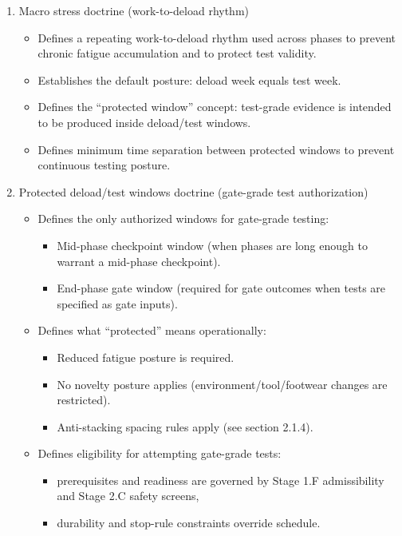 \documentclass[10pt]{article}
\begin{document}
\begin{enumerate}
\item Macro stress doctrine (work-to-deload rhythm)
\begin{itemize}
\item Defines a repeating work-to-deload rhythm used across phases to prevent chronic fatigue accumulation and to protect test validity.
\item Establishes the default posture: deload week equals test week.
\item Defines the “protected window” concept: test-grade evidence is intended to be produced inside deload/test windows.
\item Defines minimum time separation between protected windows to prevent continuous testing posture.
\end{itemize}

\item Protected deload/test windows doctrine (gate-grade test authorization)
\begin{itemize}
\item Defines the only authorized windows for gate-grade testing:
  \begin{itemize}
  \item Mid-phase checkpoint window (when phases are long enough to warrant a mid-phase checkpoint).
  \item End-phase gate window (required for gate outcomes when tests are specified as gate inputs).
  \end{itemize}
\item Defines what “protected” means operationally:
  \begin{itemize}
  \item Reduced fatigue posture is required.
  \item No novelty posture applies (environment/tool/footwear changes are restricted).
  \item Anti-stacking spacing rules apply (see section 2.1.4).
  \end{itemize}
\item Defines eligibility for attempting gate-grade tests:
  \begin{itemize}
  \item prerequisites and readiness are governed by Stage 1.F admissibility and Stage 2.C safety screens,
  \item durability and stop-rule constraints override schedule.
  \end{itemize}
\end{itemize}


\end{enumerate}
\end{document}
